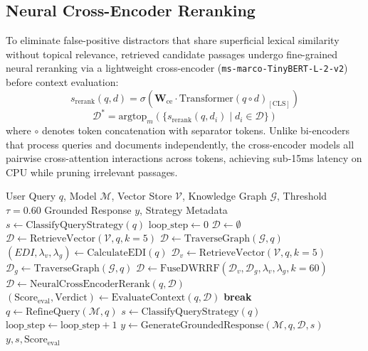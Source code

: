 \documentclass[conference]{IEEEtran}
\begin{document}
\subsection{Neural Cross-Encoder Reranking}
To eliminate false-positive distractors that share superficial lexical similarity without topical relevance, retrieved candidate passages undergo fine-grained neural reranking via a lightweight cross-encoder (\texttt{ms-marco-TinyBERT-L-2-v2}) before context evaluation:
\begin{equation}
s_{\text{rerank}}(q, d) = \sigma\left(\mathbf{W}_{\text{ce}} \cdot \text{Transformer}(q \circ d)_{[\text{CLS}]}\right)
\end{equation}
\begin{equation}
\mathcal{D}^* = \text{argtop}_m \left(\{s_{\text{rerank}}(q, d_i) \mid d_i \in \mathcal{D}\}\right)
\end{equation}
where $\circ$ denotes token concatenation with separator tokens. Unlike bi-encoders that process queries and documents independently, the cross-encoder models all pairwise cross-attention interactions across tokens, achieving sub-15ms latency on CPU while pruning irrelevant passages.

\begin{algorithm}[t]
\caption{Adaptive Multi-Strategy RAG with DW-RRF and Neural Reranking}
\label{alg:adaptive_rag}
\begin{algorithmic}[1]
\REQUIRE User Query $q$, Model $\mathcal{M}$, Vector Store $\mathcal{V}$, Knowledge Graph $\mathcal{G}$, Threshold $\tau = 0.60$
\ENSURE Grounded Response $y$, Strategy Metadata
\STATE $s \leftarrow \text{ClassifyQueryStrategy}(q)$
\STATE $\text{loop\_step} \leftarrow 0$
        \STATE $\mathcal{D} \leftarrow \emptyset$
        \STATE $\mathcal{D} \leftarrow \text{RetrieveVector}(\mathcal{V}, q, k=5)$
        \STATE $\mathcal{D} \leftarrow \text{TraverseGraph}(\mathcal{G}, q)$
    \ELSE
        \STATE $(EDI, \lambda_v, \lambda_g) \leftarrow \text{CalculateEDI}(q)$
        \STATE $\mathcal{D}_v \leftarrow \text{RetrieveVector}(\mathcal{V}, q, k=5)$
        \STATE $\mathcal{D}_g \leftarrow \text{TraverseGraph}(\mathcal{G}, q)$
        \STATE $\mathcal{D} \leftarrow \text{FuseDWRRF}(\mathcal{D}_v, \mathcal{D}_g, \lambda_v, \lambda_g, k=60)$
    \ENDIF
        \STATE $\mathcal{D} \leftarrow \text{NeuralCrossEncoderRerank}(q, \mathcal{D})$
    \ENDIF
    \STATE $(\text{Score}_{\text{eval}}, \text{Verdict}) \leftarrow \text{EvaluateContext}(q, \mathcal{D})$
        \STATE \textbf{break}
    \ELSE
        \STATE $q \leftarrow \text{RefineQuery}(\mathcal{M}, q)$
        \STATE $s \leftarrow \text{ClassifyQueryStrategy}(q)$
        \STATE $\text{loop\_step} \leftarrow \text{loop\_step} + 1$
    \ENDIF
\ENDWHILE
\STATE $y \leftarrow \text{GenerateGroundedResponse}(\mathcal{M}, q, \mathcal{D}, s)$
\RETURN $y, s, \text{Score}_{\text{eval}}$
\end{algorithmic}
\end{algorithm}
\end{document}
